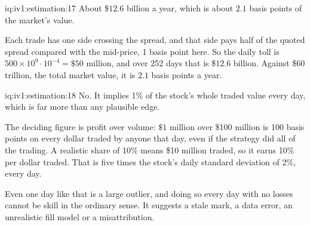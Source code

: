 \begin{solution}{iq:iv1:estimation:17}
About \$$12.6$ billion a year, which is about $2.1$ basis points of the market's value.

Each trade has one side crossing the spread, and that side pays half of the quoted spread compared with the mid-price, 1 basis point here. So the daily toll is $500 \times 10^9 \cdot 10^{-4} = \$50$ million, and over 252 days that is \$$12.6$ billion. Against \$60 trillion, the total market value, it is $2.1$ basis points a year.

\end{solution}

\begin{solution}{iq:iv1:estimation:18}
No. It implies 1\% of the stock's whole traded value every day, which is far more than any plausible edge.

The deciding figure is profit over volume: $\$1$ million over \$100 million is 100 basis points on every dollar traded by anyone that day, even if the strategy did all of the trading. A realistic share of 10\% means \$10 million traded, so it earns 10\% per dollar traded. That is five times the stock's daily standard deviation of 2\%, every day.

Even one day like that is a large outlier, and doing so every day with no losses cannot be skill in the ordinary sense. It suggests a stale mark, a data error, an unrealistic fill model or a misattribution.

\end{solution}

